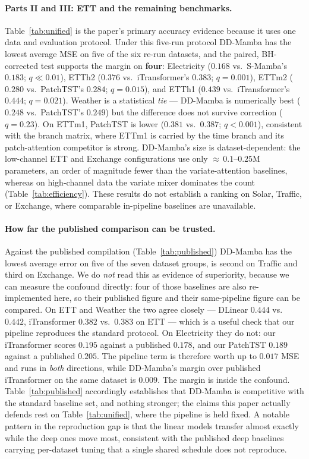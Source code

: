 \documentclass[review,12pt]{elsarticle}
\newcommand{\model}{DD-Mamba}
\begin{document}
\FloatBarrier
\paragraph{Parts II and III: ETT and the remaining benchmarks.}
Table~\ref{tab:unified} is the paper's primary accuracy evidence because it
uses one data and evaluation protocol. Under this five-run protocol \model{} has the
lowest average MSE on five of the six re-run datasets, and the paired,
BH-corrected test supports the margin on \textbf{four}: Electricity
($0.168$ vs.\ S-Mamba's $0.183$; $q\!\ll\!0.01$), ETTh2 ($0.376$ vs.\
iTransformer's $0.383$; $q{=}0.001$), ETTm2 ($0.280$ vs.\ PatchTST's
$0.284$; $q{=}0.015$), and ETTh1 ($0.439$ vs.\ iTransformer's $0.444$;
$q{=}0.021$). Weather is a statistical \emph{tie} --- \model{} is numerically
best ($0.248$ vs.\ PatchTST's $0.249$) but the difference does not survive
correction ($q{=}0.23$). On ETTm1, PatchTST is lower
($0.381$ vs.\ $0.387$; $q{<}0.001$), consistent
with the branch matrix, where ETTm1 is carried by the time branch and its
patch-attention competitor is strong. \model{}'s size is
dataset-dependent: the low-channel ETT and Exchange configurations use only
$\approx\,0.1$--$0.25$M parameters, an order of magnitude fewer than the
variate-attention baselines, whereas on high-channel data the variate mixer
dominates the count (Table~\ref{tab:efficiency}). These results do not
establish a ranking on Solar, Traffic, or Exchange, where comparable
in-pipeline baselines are unavailable.

\paragraph{How far the published comparison can be trusted.} Against the
published compilation (Table~\ref{tab:published}) \model{} has the lowest
average error on five of the seven dataset groups, is second on Traffic and
third on Exchange. We do \emph{not} read this as evidence of superiority,
because we can measure the confound directly: four of those baselines are
also re-implemented here, so their published figure and their same-pipeline
figure can be compared. On ETT and Weather the two agree closely --- DLinear
$0.444$ vs.\ $0.442$, iTransformer $0.382$ vs.\ $0.383$ on ETT --- which is
a useful check that our pipeline reproduces the standard protocol. On
Electricity they do not: our iTransformer scores $0.195$ against a published
$0.178$, and our PatchTST $0.189$ against a published $0.205$. The
pipeline term is therefore worth up to $0.017$ MSE and runs in \emph{both}
directions, while \model{}'s margin over published iTransformer on the same
dataset is $0.009$. The margin is inside the confound. Table~\ref{tab:published}
accordingly establishes that \model{} is competitive with the standard
baseline set, and nothing stronger; the claims this paper actually defends
rest on Table~\ref{tab:unified}, where the pipeline is held fixed. A notable
pattern in the reproduction gap is that the linear models transfer almost
exactly while the deep ones move most, consistent with the published deep
baselines carrying per-dataset tuning that a single shared schedule does not
reproduce.
\end{document}
